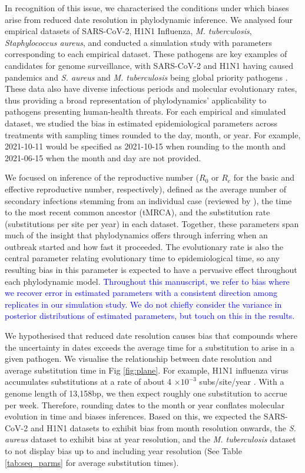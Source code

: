 \documentclass[12pt]{article}
\begin{document}
\begin{spacing}{2}
In recognition of this issue, we characterised the conditions under which biases arise from reduced date resolution in phylodynamic inference. We analysed four empirical datasets of SARS-CoV-2, H1N1 Influenza, \textit{M. tuberculosis}, \textit{Staphylococcus aureus}, and conducted a simulation study with parameters corresponding to each empirical dataset. These pathogens are key examples of candidates for genome surveillance, with SARS-CoV-2 and H1N1 having caused pandemics and \textit{S. aureus} and \textit{M. tuberculosis} being global priority pathogens \citep{who_bppl_2024}. These data also have diverse infectious periods and molecular evolutionary rates, thus providing a broad representation of phylodynamics' applicability to pathogens presenting human-health threats. For each empirical and simulated dataset, we studied the bias in estimated epidemiological parameters across treatments with sampling times rounded to the day, month, or year. For example, 2021-10-11 would be specified as 2021-10-15 when rounding to the month and 2021-06-15 when the month and day are not provided.

We focused on inference of the reproductive number ($R_0$ or $R_e$ for the basic and effective reproductive number, respectively), defined as the average number of secondary infections stemming from an individual case (reviewed by \citet{du2015getting,featherstone2022epidemiological, kuhnert2011phylogenetic}), the time to the most recent common ancestor (tMRCA), and the substitution rate (substitutions per site per year) in each dataset. Together, these parameters span much of the insight that phylodynamics offers through inferring when an outbreak started and how fast it proceeded. The evolutionary rate is also the central parameter relating evolutionary time to epidemiological time, so any resulting bias in this parameter is expected to have a pervasive effect throughout each phylodynamic model. \textcolor{blue}{Throughout this manuscript, we refer to bias where we recover error in estimated parameters with a consistent direction among replicates in our simulation study. We do not chiefly consider the variance in posterior distributions of estimated parameters, but touch on this in the results.}

 We hypothesised that reduced date resolution causes bias that compounds where the uncertainty in dates exceeds the average time for a substitution to arise in a given pathogen. We visualise the relationship between date resolution and average substitution time in Fig \ref{fig:plane}. For example, H1N1 influenza virus accumulates substitutions at a rate of about 4 $\times10^{-3}$ subs/site/year \citep{hedge_2013_real-time}. With a genome length of 13,158bp, we then expect roughly one substitution to accrue per week. Therefore, rounding dates to the month or year conflates molecular evolution in time and biases inferences. Based on this, we expected the SARS-CoV-2 and H1N1 datasets to exhibit bias from month resolution onwards, the \textit{S. aureus} dataset to exhibit bias at year resolution, and the \textit{M. tuberculosis} dataset to not display bias up to and including year resolution (See Table \ref{tab:seq_parms} for average substitution times).
 

\end{spacing}
\end{document}
